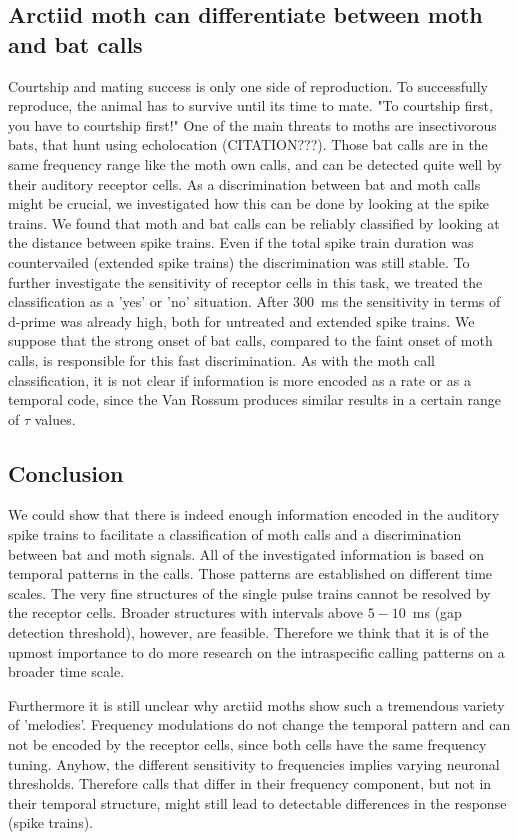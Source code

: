 \documentclass[12pt,a4paper]{article}
\begin{document}
\subsection{Arctiid moth can differentiate between moth and bat calls}
Courtship and mating success is only one side of reproduction. To successfully reproduce, the animal has to survive until its time to mate. "To courtship first, you have to courtship first!" One of the main threats to moths are insectivorous bats, that hunt using echolocation (CITATION???). Those bat calls are in the same frequency range like the moth own calls, and can be detected quite well by their auditory receptor cells. As a discrimination between bat and moth calls might be crucial, we investigated how this can be done by looking at the spike trains. We found that moth and bat calls can be reliably classified by looking at the distance between spike trains. Even if the total spike train duration was countervailed (extended spike trains) the discrimination was still stable. To further investigate the sensitivity of receptor cells in this task, we treated the classification as a 'yes' or 'no' situation. After 300~ms the sensitivity in terms of d-prime was already high, both for untreated and extended spike trains. We suppose that the strong onset of bat calls, compared to the faint onset of moth calls, is responsible for this fast discrimination. As with the moth call classification, it is not clear if information is more encoded as a rate or as a temporal code, since the Van Rossum produces similar results in a certain range of $ \tau $ values.

\newpage
\subsection{Conclusion} 
We could show that there is indeed enough information encoded in the auditory spike trains to facilitate a classification of moth calls and a discrimination between bat and moth signals. All of the investigated information is based on temporal patterns in the calls. Those patterns are established on different time scales. The very fine structures of the single pulse trains cannot be resolved by the receptor cells. Broader structures with intervals above $5-10$~ms (gap detection threshold), however, are feasible. Therefore we think that it is of the upmost importance to do more research on the intraspecific calling patterns on a broader time scale. 

Furthermore it is still unclear why arctiid moths show such a tremendous variety of 'melodies'. Frequency modulations do not change the temporal pattern and can not be encoded by the receptor cells, since both cells have the same frequency tuning. Anyhow, the different sensitivity to frequencies implies varying neuronal thresholds. Therefore calls that differ in their frequency component, but not in their temporal structure, might still lead to detectable differences in the response (spike trains). 
\end{document}
